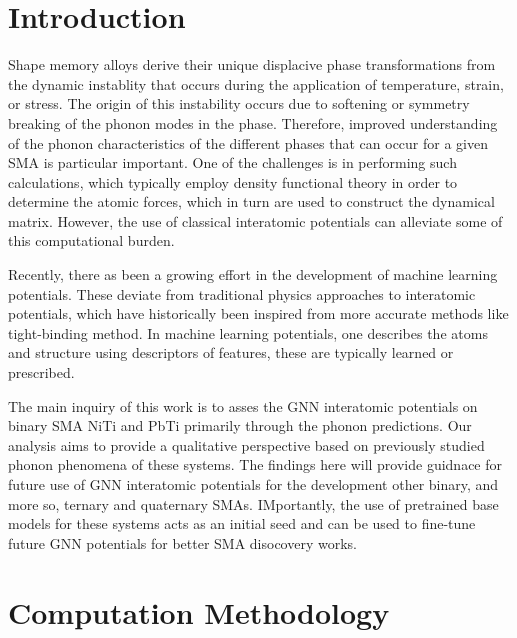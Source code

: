 \documentclass[preprint]{elsarticle}
\begin{document}
\section{Introduction}
\label{sec:intro}
Shape memory alloys derive their unique displacive phase transformations from the dynamic instablity that occurs during the application of temperature, strain, or stress. The origin of this instability occurs due to softening or symmetry breaking of the phonon modes in the phase. Therefore, improved understanding of the phonon characteristics of the different phases that can occur for a given SMA is particular important. One of the challenges is in performing such calculations, which typically employ density functional theory in order to determine the atomic forces, which in turn are used to construct the dynamical matrix. However, the use of classical interatomic potentials can alleviate some of this computational burden. \par

Recently, there as been a growing effort in the development of machine learning potentials. These deviate from traditional physics approaches to interatomic potentials, which have historically been inspired from more accurate methods like tight-binding method. In machine learning potentials, one describes the atoms and structure using descriptors of features, these are typically learned or prescribed.


The main inquiry of this work is to asses the GNN interatomic potentials on binary SMA NiTi and PbTi primarily through the phonon predictions. Our analysis aims to provide a qualitative perspective based on previously studied phonon phenomena of these systems. The findings here will provide guidnace for future use of GNN interatomic potentials for the development other binary, and more so, ternary and quaternary SMAs. IMportantly, the use of pretrained base models for these systems acts as an initial seed and can be used to fine-tune future GNN potentials for better SMA disocovery works. \par



\section{Computation Methodology}
\label{sec:methods}
\end{document}
